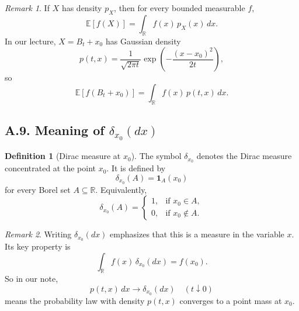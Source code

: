 \documentclass[11pt]{article}
\theoremstyle{definition}
\newtheorem{definition}{Definition}
\theoremstyle{remark}
\newtheorem{remark}{Remark}
\begin{document}
\begin{remark}
If $X$ has density $p_X$, then for every bounded measurable $f$,
\[
\mathbb E[f(X)]=\int_{\mathbb R} f(x)\,p_X(x)\,dx.
\]
In our lecture, $X=B_t+x_0$ has Gaussian density
\[
p(t,x)=\frac{1}{\sqrt{2\pi t}}\exp\!\left(-\frac{(x-x_0)^2}{2t}\right),
\]
so
\[
\mathbb E[f(B_t+x_0)]=\int_{\mathbb R} f(x)\,p(t,x)\,dx.
\]
\end{remark}

\subsection*{A.9. Meaning of $\delta_{x_0}(dx)$}
\begin{definition}[Dirac measure at $x_0$]
The symbol $\delta_{x_0}$ denotes the Dirac measure concentrated at the point $x_0$. It is defined by
\[
\delta_{x_0}(A)=\mathbf 1_A(x_0)
\]
for every Borel set $A\subseteq\mathbb R$. Equivalently,
\[
\delta_{x_0}(A)=
\begin{cases}
1, & \text{if } x_0\in A,\\
0, & \text{if } x_0\notin A.
\end{cases}
\]
\end{definition}

\begin{remark}
Writing $\delta_{x_0}(dx)$ emphasizes that this is a measure in the variable $x$. Its key property is
\[
\int_{\mathbb R} f(x)\,\delta_{x_0}(dx)=f(x_0).
\]
So in our note,
\[
p(t,x)\,dx\to\delta_{x_0}(dx)\quad (t\downarrow0)
\]
means the probability law with density $p(t,x)$ converges to a point mass at $x_0$.
\end{remark}
\end{document}
